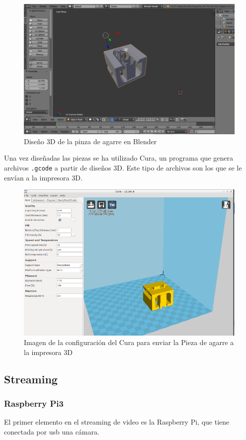 \documentclass[twoside, 12pt]{epstfg}
\begin{document}
\begin{figure}[h]
	\centerline{
		\mbox{\includegraphics[width=.80\textwidth]{images/cameraBlender.png}}
	}
	\caption{ Diseño 3D de la pinza de agarre en Blender}
\end{figure}

Una vez diseñadas las piezas se ha utilizado Cura, un programa que genera archivos \texttt{.gcode} a partir de diseños 3D. Este tipo de archivos son los que se le envían a la impresora 3D.

\begin{figure}[h]
	\centerline{
		\mbox{\includegraphics[width=.75\textwidth]{images/Cura2.png}}
	}
	\caption{Imagen de la configuración del Cura para enviar la Pieza de agarre a la impresora 3D}
\end{figure}
 
\newpage
\subsection{Streaming}
\subsubsection{Raspberry Pi3}
El primer elemento en el streaming de video es la Raspberry Pi, que tiene conectada por usb una cámara.
\end{document}
